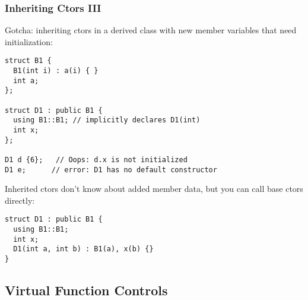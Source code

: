 \begin{frame}[fragile]
\frametitle{Inheriting Ctors III}
Gotcha: inheriting ctors in a derived class with new member variables that
need initialization:

{\scriptsize
\begin{verbatim}
struct B1 {
  B1(int i) : a(i) { }
  int a;
};

struct D1 : public B1 {
  using B1::B1; // implicitly declares D1(int)
  int x;
};

D1 d {6};   // Oops: d.x is not initialized
D1 e;      // error: D1 has no default constructor
\end{verbatim}
}

Inherited ctors don't know about added member data, but you can call
base ctors directly:
{\scriptsize
\begin{verbatim}
struct D1 : public B1 {
  using B1::B1;
  int x;
  D1(int a, int b) : B1(a), x(b) {}
}
\end{verbatim}
}

\end{frame}

\subsection{Virtual Function Controls}


